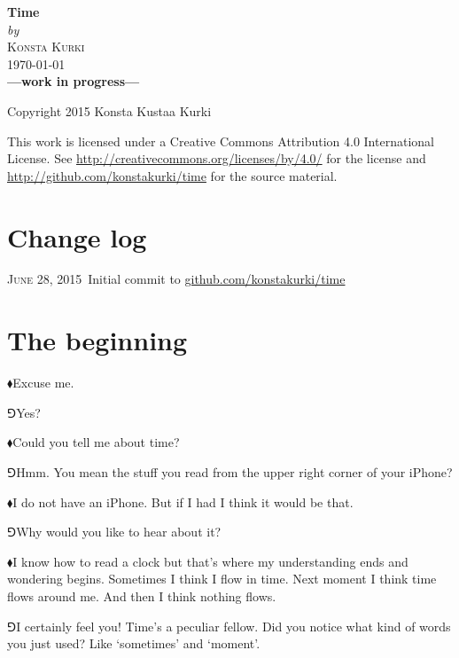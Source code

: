 \documentclass[10pt,oneside%
]{memoir}
\newcommand{\hea}{\(\blacklozenge\)\;}
\newcommand{\heb}{\(\Game\)\;}
\begin{document}
\frontmatter
\begin{titlingpage}
	\begin{centering}
		\HUGE\textbf{Time}\\
		\vspace{0.4em}
		\normalsize\emph{by}\\
		\vspace{0.4em}
		\textsc{Konsta Kurki}\\
		\vspace{0.4em}
		\textsc{\today}\\
		\vspace{5em}
		\textbf{---work in progress---}\\
	\end{centering}
	\vfill

	Copyright {\textcopyright} 2015 Konsta Kustaa Kurki

	This work is licensed under a Creative Commons Attribution 4.0 International License. See \url{http://creativecommons.org/licenses/by/4.0/} for the license and \url{http://github.com/konstakurki/time} for the source material.
\end{titlingpage}
\chapter{Change log}
\textsc{June 28, 2015}\, Initial commit to \url{github.com/konstakurki/time}
\mainmatter
\chapter{The beginning}
\hea Excuse me.

\heb Yes?

\hea Could you tell me about time?

\heb Hmm. You mean the stuff you read from the upper right corner of your iPhone?

\hea I do not have an iPhone. But if I had I think it would be that.

\heb Why would you like to hear about it?

\hea I know how to read a clock but that's where my understanding ends and wondering begins. Sometimes I think I flow in time. Next moment I think time flows around me. And then I think nothing flows.

\heb I certainly feel you! Time's a peculiar fellow. Did you notice what kind of words you just used? Like `sometimes' and `moment'.
\end{document}
